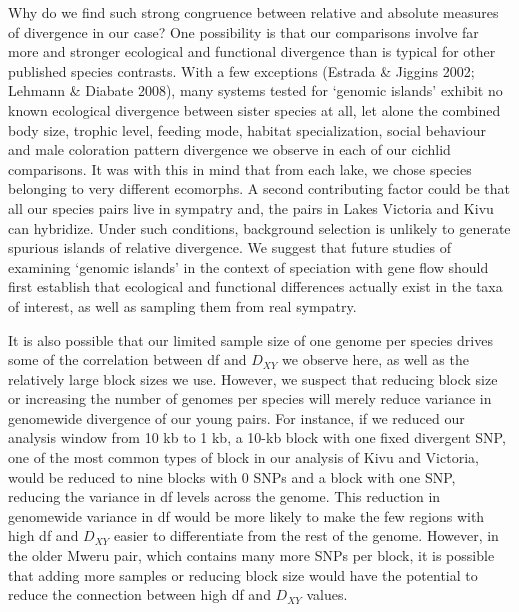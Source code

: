 Why do we find such strong congruence between relative and absolute measures of divergence in our case? One possibility is that our comparisons involve far more and stronger ecological and functional divergence than is typical for other published species contrasts. With a few exceptions (Estrada & Jiggins 2002; Lehmann & Diabate 2008), many systems tested for ‘genomic islands’ exhibit no known ecological divergence between sister species at all, let alone the combined body size, trophic level, feeding mode, habitat specialization, social behaviour and male coloration pattern divergence we observe in each of our cichlid comparisons. It was with this in mind that from each lake, we chose species belonging to very different ecomorphs. A second contributing factor could be that all our species pairs live in sympatry and, the pairs in Lakes Victoria and Kivu can hybridize. Under such conditions, background selection is unlikely to generate spurious islands of relative divergence. We suggest that future studies of examining ‘genomic islands’ in the context of speciation with gene flow should first establish that ecological and functional differences actually exist in the taxa of interest, as well as sampling them from real sympatry.

It is also possible that our limited sample size of one genome per species drives some of the correlation between df and $D_{XY}$ we observe here, as well as the relatively large block sizes we use. However, we suspect that reducing block size or increasing the number of genomes per species will merely reduce variance in genomewide divergence of our young pairs. For instance, if we reduced our analysis window from 10 kb to 1 kb, a 10-kb block with one fixed divergent SNP, one of the most common types of block in our analysis of Kivu and Victoria, would be reduced to nine blocks with 0 SNPs and a block with one SNP, reducing the variance in df levels across the genome. This reduction in genomewide variance in df would be more likely to make the few regions with high df and $D_{XY}$ easier to differentiate from the rest of the genome. However, in the older Mweru pair, which contains many more SNPs per block, it is possible that adding more samples or reducing block size would have the potential to reduce the connection between high df and $D_{XY}$ values.

